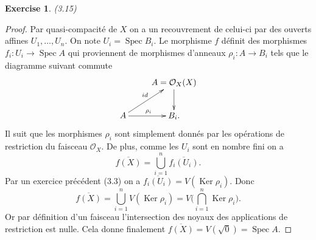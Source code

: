 \documentclass[A4, 11pt]{article}
\newtheorem{exer}{Exercise}
\def\Ker{  \operatorname{Ker} }
\def\Spec{ \operatorname{Spec}}
\begin{document}
\begin{exer}(3.15)
\end{exer}
\begin{proof}
Par quasi-compacité de $X$ on a un recouvrement de celui-ci par des ouverts affines $U_1,\dots, U_n$. On note $U_i=\Spec B_i$. Le morphisme $f$ définit des morphismes $f_i\colon U_i \rightarrow \Spec A$ qui proviennent de morphismes d'anneaux $\rho_i\colon A\rightarrow B_i$ tels que le diagramme suivant commute
$$\xymatrix{
& A=\mathcal{O}_X(X) \ar[d] \\
A \ar[ur]^{id} \ar[r]^{\rho_i} & B_i .
}$$
Il suit que les morphismes $\rho_i$ sont simplement donnés par les opérations de restriction du faisceau $\mathcal{O}_X$. De plus, comme les $U_i$ sont en nombre fini on a 
$$\overline{f(X)}= \bigcup\limits_{i=1}^n \overline{f_i(U_i)}.$$
Par un exercice précédent (3.3) on a $\overline{f_i(U_i)}=V(\Ker \rho_i)$. Donc
$$\overline{f(X)}=\bigcup\limits_{i=1}^n V(\Ker \rho_i)=V\big(\bigcap\limits_{i=1}^n \Ker \rho_i \big).$$
Or par définition d'un faisceau l'intersection des noyaux des applications de restriction est nulle. Cela donne finalement $\overline{f(X)}=V(\sqrt{0})=\Spec A$.
\end{proof}
 
\end{document}
